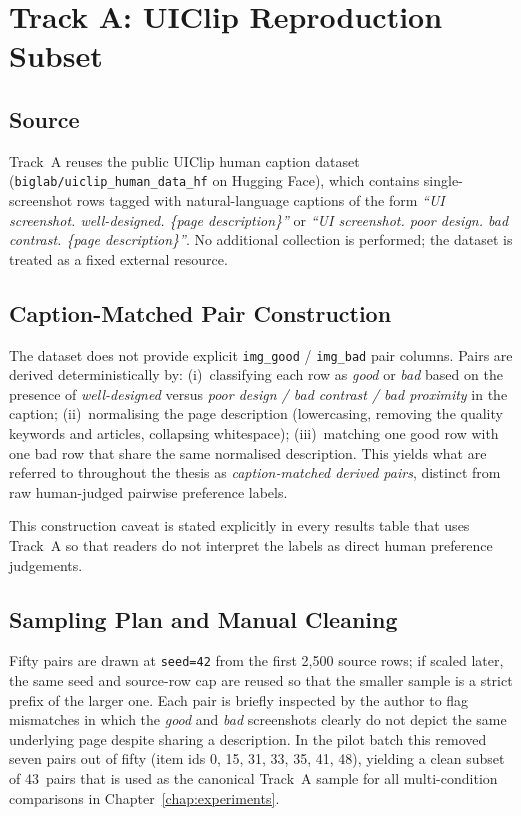 \section{Track A: UIClip Reproduction Subset}
\label{sec:track-a-construction}

\subsection{Source}

Track~A reuses the public UIClip human caption dataset
(\texttt{biglab/uiclip\_human\_data\_hf} on Hugging Face), which contains
single-screenshot rows tagged with natural-language captions of the form
\textit{``UI screenshot. well-designed. \{page description\}''} or
\textit{``UI screenshot. poor design. bad contrast. \{page description\}''}.
No additional collection is performed; the dataset is treated as a
fixed external resource.

\subsection{Caption-Matched Pair Construction}

The dataset does not provide explicit \texttt{img\_good} /
\texttt{img\_bad} pair columns. Pairs are derived deterministically by:
(i)~classifying each row as \emph{good} or \emph{bad} based on the
presence of \textit{well-designed} versus \textit{poor design / bad
contrast / bad proximity} in the caption;
(ii)~normalising the page description (lowercasing, removing the
quality keywords and articles, collapsing whitespace);
(iii)~matching one good row with one bad row that share the same
normalised description. This yields what are referred to throughout the
thesis as \emph{caption-matched derived pairs}, distinct from raw
human-judged pairwise preference labels.

This construction caveat is stated explicitly in every results table
that uses Track~A so that readers do not interpret the labels as
direct human preference judgements.

\subsection{Sampling Plan and Manual Cleaning}

Fifty pairs are drawn at \texttt{seed=42} from the first 2{,}500 source
rows; if scaled later, the same seed and source-row cap are reused so
that the smaller sample is a strict prefix of the larger one. Each pair
is briefly inspected by the author to flag mismatches in which the
\emph{good} and \emph{bad} screenshots clearly do not depict the same
underlying page despite sharing a description. In the pilot batch this
removed seven pairs out of fifty (item ids 0, 15, 31, 33, 35, 41, 48),
yielding a clean subset of 43~pairs that is used as the canonical
Track~A sample for all multi-condition comparisons in
Chapter~\ref{chap:experiments}.

